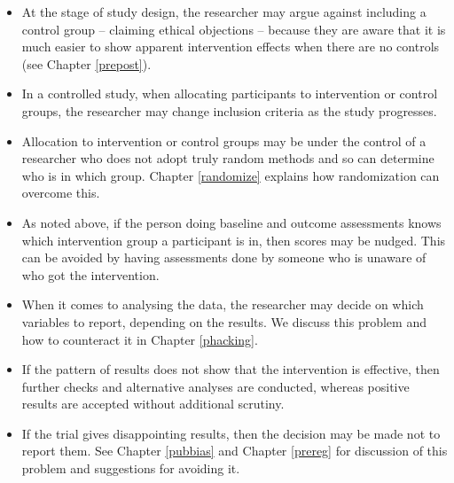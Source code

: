 \documentclass{krantz}
\providecommand{\tightlist}{%
\setlength{\itemsep}{0pt}\setlength{\parskip}{0pt}}
\begin{document}
\begin{itemize}
\tightlist
\item
  At the stage of study design, the researcher may argue against including a control group -- claiming ethical objections -- because they are aware that it is much easier to show apparent intervention effects when there are no controls (see Chapter \ref{prepost}).
\item
  In a controlled study, when allocating participants to intervention or control groups, the researcher may change inclusion criteria as the study progresses.
\item
  Allocation to intervention or control groups may be under the control of a researcher who does not adopt truly random methods and so can determine who is in which group. Chapter \ref{randomize} explains how randomization can overcome this.
\item
  As noted above, if the person doing baseline and outcome assessments knows which intervention group a participant is in, then scores may be nudged. This can be avoided by having assessments done by someone who is unaware of who got the intervention.
\item
  When it comes to analysing the data, the researcher may decide on which variables to report, depending on the results. We discuss this problem and how to counteract it in Chapter \ref{phacking}.
\item
  If the pattern of results does not show that the intervention is effective, then further checks and alternative analyses are conducted, whereas positive results are accepted without additional scrutiny.
\item
  If the trial gives disappointing results, then the decision may be made not to report them. See Chapter \ref{pubbias} and Chapter \ref{prereg} for discussion of this problem and suggestions for avoiding it.
\end{itemize}
\end{document}

